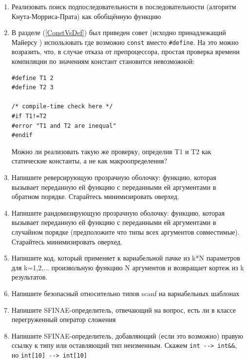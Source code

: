 \documentclass[a4paper,12pt,oneside]{book}
\begin{document}
\begin{enumerate}

\item
Реализовать поиск подпоследовательности в последовательности (алгоритм Кнута-Морриса-Прата) как обобщённую функцию

\item
В разделе (\ref{ConstVsDef}) был приведен совет (исходно принадлежащий Майерсу \cite{effcpp3d}) использовать где возможно \lstinline!const! вместо \lstinline!#define!. На это можно возразить, что, в случае отказа от препроцессора, простая проверка времени компиляции по значениям констант становится невозможной:

\begin{lstlisting}
#define T1 2
#define T2 3

/* compile-time check here */
#if T1!=T2
#error "T1 and T2 are inequal"
#endif
\end{lstlisting}

Можно ли реализовать такую же проверку, определив T1 и T2 как статические константы, а не как макроопределения?

\item 
Напишите реверсирующую прозрачную оболочку: функцию, которая вызывает переданную ей функцию с переданными ей аргументами в обратном порядке. Старайтесь минимизировать оверхед.

\item 
Напишите рандомизирующую прозрачную оболочку: функцию, которая вызывает переданную ей функцию с переданными ей аргументами в случайном порядке (предположите что типы всех аргументов совместимые). Старайтесь минимизировать оверхед.

\item 
Напишите код, который применяет к вариабельной пачке из k*N параметров для k=1,2,... произвольную функцию N аргументов и возвращает кортеж из k результатов.

\item 
Напишите безопасный относительно типов scanf на вариабельных шаблонах

\item 
Напишите SFINAE-определитель, отвечающий на вопрос, есть ли в классе перегруженный оператор сложения

\item 
Напишите SFINAE-определитель, добавляющий (если это возможно) правую ссылку к типу или оставляющий тип неизменным. Скажем \lstinline!int --> int&&!, но \lstinline!int[10] --> int[10]!


\end{enumerate}
\end{document}
